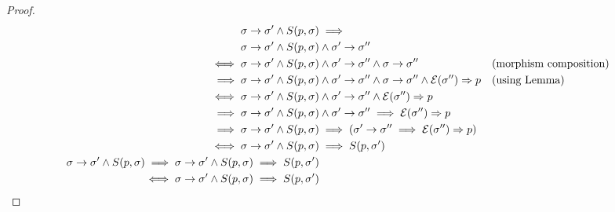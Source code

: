 \documentclass{article}
\theoremstyle{definition}
\begin{document}
\begin{proof}
  \begin{align*}
    \sigma \to \sigma' \land S(p,\sigma)& \implies\\
    \sigma \to \sigma' \land S(p,\sigma)& \land \sigma' \to \sigma'' \\
    \iff \sigma \to \sigma' \land S(p,\sigma)& \land \sigma' \to \sigma'' \land \sigma \to \sigma'' &&\text{(morphism composition)} \\
    \implies \sigma \to \sigma' \land S(p,\sigma)& \land \sigma' \to \sigma'' \land \sigma \to \sigma'' \land \mathcal{E}(\sigma'') \Rightarrow p  &&\text{(using Lemma)} \\
    \iff \sigma \to \sigma' \land S(p,\sigma)& \land \sigma' \to \sigma'' \land \mathcal{E}(\sigma'') \Rightarrow p \\
    \implies \sigma \to \sigma' \land S(p,\sigma)& \land \sigma' \to \sigma'' \implies \mathcal{E}(\sigma'') \Rightarrow p  \\
    \implies \sigma \to \sigma' \land S(p,\sigma)& \implies( \sigma' \to \sigma'' \implies \mathcal{E}(\sigma'') \Rightarrow p ) \\
    \iff \sigma \to \sigma' \land S(p,\sigma)& \implies S(p, \sigma') \\
    \sigma \to \sigma' \land S(p,\sigma) \implies \sigma \to \sigma' \land S(p,\sigma) \implies S(p, \sigma') \\
    \iff \sigma \to \sigma' \land S(p,\sigma) \implies S(p, \sigma') &&\qedhere
  \end{align*}
\end{proof}
\end{document}
